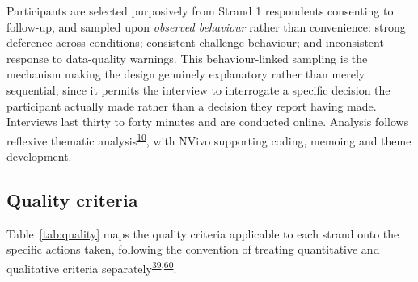 \documentclass[11pt,a4paper]{article}
\numberwithin{figure}{section}
\numberwithin{table}{section}
\begin{document}
Participants are selected purposively from Strand 1 respondents consenting to follow-up, and sampled upon
\emph{observed behaviour} rather than convenience: strong deference across conditions; consistent challenge
behaviour; and inconsistent response to data-quality warnings. This behaviour-linked sampling is the
mechanism making the design genuinely explanatory rather than merely sequential, since it permits the
interview to interrogate a specific decision the participant actually made rather than a decision they
report having made. Interviews last thirty to forty minutes and are conducted online. Analysis follows
reflexive thematic analysis\textsuperscript{\hyperlink{ref10}{10}}, with NVivo supporting coding, memoing and theme development.

\subsection{Quality criteria}

Table~\ref{tab:quality} maps the quality criteria applicable to each strand onto the specific actions taken,
following the convention of treating quantitative and qualitative criteria
separately\textsuperscript{\hyperlink{ref39}{39},\hyperlink{ref60}{60}}.
\end{document}
